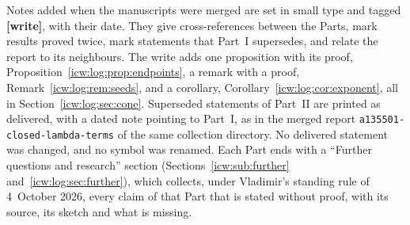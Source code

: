 \documentclass[11pt,letterpaper]{article}
\theoremstyle{remark}\newtheorem{remark}[theorem]{Remark}
\newcommand{\1}{\mathbf1}
\newcommand{\file}[1]{\textup{\nolinkurl{#1}}}
\begin{document}
Notes added when the manuscripts were merged are set in small type and tagged \textbf{[write]}, with their date. They give cross-references between the Parts, mark results proved twice, mark statements that Part~I supersedes, and relate the report to its neighbours. The write adds one proposition with its proof, Proposition~\ref{icw:log:prop:endpoints}, a remark with a proof, Remark~\ref{icw:log:rem:seeds}, and a corollary, Corollary~\ref{icw:log:cor:exponent}, all in Section~\ref{icw:log:sec:cone}. Superseded statements of Part~II are printed as delivered, with a dated note pointing to Part~I, as in the merged report \file{a135501-closed-lambda-terms} of the same collection directory. No delivered statement was changed, and no symbol was renamed. Each Part ends with a ``Further questions and research'' section (Sections~\ref{icw:sub:further} and~\ref{icw:log:sec:further}), which collects, under Vladimir's standing rule of 4~October 2026, every claim of that Part that is stated without proof, with its source, its sketch and what is missing.
\end{document}
